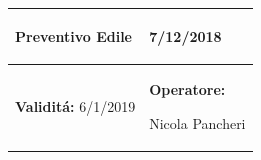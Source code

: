 \documentclass[a4paper]{article}
\begin{document}
                          \begin{center}
                          \begin{tabular}{|L{89mm} R{60mm}| }
                          \hline
                          \vspace{2.5mm}
                          \begin{spacing}{0}
                        \textbf{Preventivo Edile}
                          \end{spacing}&
                          \vspace{2.5mm}
                          \begin{spacing}{0}

                        7/12/2018

                          \end{spacing}\\
                          \hline
                          \vspace{2.5mm}
                          \begin{spacing}{0}
                            \textbf{Validit\'a:}
                       6/1/2019
                          \end{spacing} &
                          \vspace{2.5mm}
                          \begin{spacing}{0}
                            \textbf{Operatore:}

                       Nicola Pancheri
                          \end{spacing} \\
                          \hline
                          \end{tabular}
                          \end{center}
                       
\end{document}
